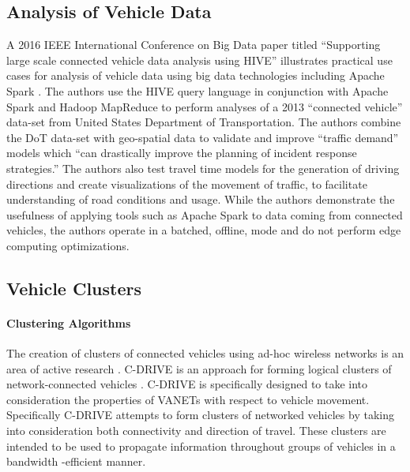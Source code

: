 \documentclass{thesis}
\begin{document}
    \subsection{Analysis of Vehicle Data}
        A 2016 IEEE International Conference on Big Data paper titled ``Supporting large scale
        connected vehicle data analysis using HIVE'' illustrates practical use cases for analysis
        of vehicle data using big data technologies including Apache Spark \cite{cv:hive}. 
        The authors use the HIVE \cite{hive} query language in conjunction with Apache Spark
        \cite{spark} and Hadoop MapReduce \cite{hdfs} to perform analyses of a 2013 ``connected vehicle'' data-set from
        United States Department of Transportation. The authors combine the DoT data-set with
        geo-spatial data to validate and improve ``traffic demand'' models which ``can drastically
        improve the planning of incident response strategies.'' The authors also test travel
        time models for the generation of driving directions and create visualizations of the movement
        of traffic, to facilitate understanding of road conditions and usage. While the authors demonstrate the 
        usefulness of applying tools such as Apache Spark to data coming from connected vehicles, the
        authors operate in a batched, offline, mode and do not perform edge computing optimizations.
    \subsection{Vehicle Clusters}
        \paragraph{Clustering Algorithms}
            The creation of clusters of connected vehicles using ad-hoc wireless networks
            is an area of active research \cite{cdrive}\cite{sbca}\cite{clusterselection}.%
            C-DRIVE is an approach for forming logical clusters of network-connected vehicles \cite{cdrive}.
            C-DRIVE is specifically designed to take into consideration the properties
            of VANETs with respect to vehicle movement. Specifically C-DRIVE attempts
            to form clusters of networked vehicles by taking into consideration both
            connectivity and direction of travel. These clusters are intended to be
            used to propagate information throughout groups of vehicles in a bandwidth
            -efficient manner. %
\end{document}
